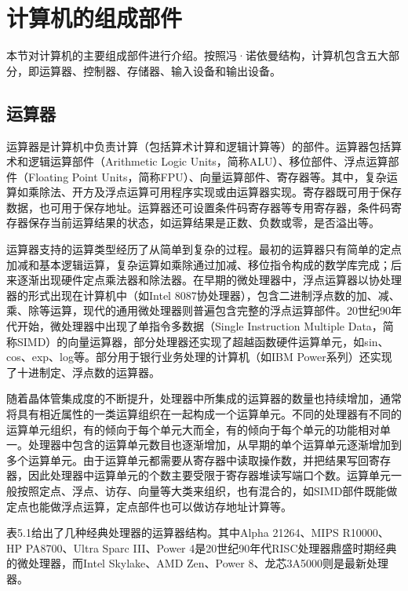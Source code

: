 \documentclass[]{ctexbook}
\begin{document}
\hypertarget{ux8ba1ux7b97ux673aux7684ux7ec4ux6210ux90e8ux4ef6}{%
\section{计算机的组成部件}\label{ux8ba1ux7b97ux673aux7684ux7ec4ux6210ux90e8ux4ef6}}

本节对计算机的主要组成部件进行介绍。按照冯·诺依曼结构，计算机包含五大部分，即运算器、控制器、存储器、输入设备和输出设备。

\hypertarget{ux8fd0ux7b97ux5668}{%
\subsection{运算器}\label{ux8fd0ux7b97ux5668}}

运算器是计算机中负责计算（包括算术计算和逻辑计算等）的部件。运算器包括算术和逻辑运算部件（Arithmetic Logic Units，简称ALU）、移位部件、浮点运算部件（Floating Point Units，简称FPU）、向量运算部件、寄存器等。其中，复杂运算如乘除法、开方及浮点运算可用程序实现或由运算器实现。寄存器既可用于保存数据，也可用于保存地址。运算器还可设置条件码寄存器等专用寄存器，条件码寄存器保存当前运算结果的状态，如运算结果是正数、负数或零，是否溢出等。

运算器支持的运算类型经历了从简单到复杂的过程。最初的运算器只有简单的定点加减和基本逻辑运算，复杂运算如乘除通过加减、移位指令构成的数学库完成；后来逐渐出现硬件定点乘法器和除法器。在早期的微处理器中，浮点运算器以协处理器的形式出现在计算机中（如Intel 8087协处理器），包含二进制浮点数的加、减、乘、除等运算，现代的通用微处理器则普遍包含完整的浮点运算部件。20世纪90年代开始，微处理器中出现了单指令多数据（Single Instruction Multiple Data，简称SIMD）的向量运算器，部分处理器还实现了超越函数硬件运算单元，如sin、cos、exp、log等。部分用于银行业务处理的计算机（如IBM Power系列）还实现了十进制定、浮点数的运算器。

随着晶体管集成度的不断提升，处理器中所集成的运算器的数量也持续增加，通常将具有相近属性的一类运算组织在一起构成一个运算单元。不同的处理器有不同的运算单元组织，有的倾向于每个单元大而全，有的倾向于每个单元的功能相对单一。处理器中包含的运算单元数目也逐渐增加，从早期的单个运算单元逐渐增加到多个运算单元。由于运算单元都需要从寄存器中读取操作数，并把结果写回寄存器，因此处理器中运算单元的个数主要受限于寄存器堆读写端口个数。运算单元一般按照定点、浮点、访存、向量等大类来组织，也有混合的，如SIMD部件既能做定点也能做浮点运算，定点部件也可以做访存地址计算等。

表5.1给出了几种经典处理器的运算器结构。其中Alpha 21264、MIPS R10000、HP PA8700、Ultra Sparc III、Power 4是20世纪90年代RISC处理器鼎盛时期经典的微处理器，而Intel Skylake、AMD Zen、Power 8、龙芯3A5000则是最新处理器。
\end{document}
